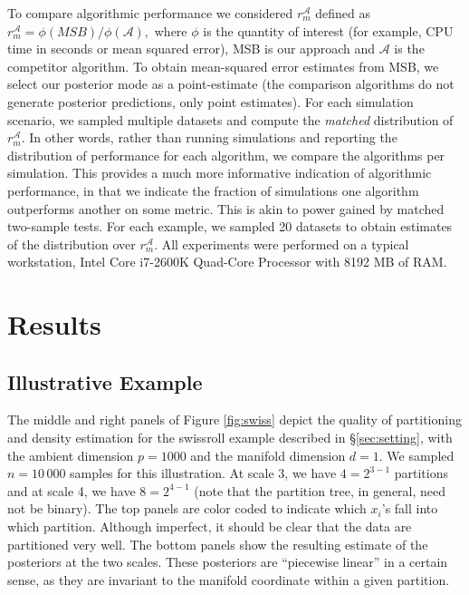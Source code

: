 \documentclass{article} %
\providecommand{\mc}[1]{\mathcal{#1}}
\begin{document}
To compare algorithmic performance we considered $r_{m}^{\mc{A}}$ defined as $r_{m}^{\mc{A}}=\phi(MSB)/\phi(\mc{A}),$
where $\phi$ is the quantity of interest (for example, CPU time in seconds or mean squared error), MSB is our approach and $\mc{A}$ is the competitor algorithm. To obtain mean-squared error estimates from MSB, we select our posterior mode as a point-estimate (the comparison algorithms do not generate posterior predictions, only point estimates).
For each simulation scenario, we sampled multiple datasets and compute the \emph{matched} distribution of $r_{m}^{\mc{A}}$. In other words, rather than running simulations and reporting the distribution of performance for each algorithm, we compare the algorithms per simulation.  This provides a much more informative indication of algorithmic performance, in that we indicate the fraction of simulations one algorithm outperforms another on some metric.  This is akin to power gained by matched two-sample tests.   For each example, we sampled 20 datasets to obtain estimates of the distribution over $r_m^{\mc{A}}$.
% 
All experiments were performed on a typical workstation, Intel Core i7-2600K Quad-Core Processor with  8192 MB of RAM.


\section{Results}

\subsection{Illustrative Example} \label{sub:ill}

The middle and right panels of Figure \ref{fig:swiss} depict the quality of partitioning and density estimation for the swissroll example described in \S \ref{sec:setting}, with the ambient dimension $p=1000$ and the manifold dimension $d=1$.  We sampled $n=10\,000$ samples for this illustration. At scale 3, we have $4=2^{3-1}$ partitions and at scale 4, we have $8=2^{4-1}$ (note that the partition tree, in general, need not be binary).  The top panels are color coded to indicate which  $x_i$'s fall into which partition.  Although imperfect, it should be clear that the data are partitioned very well.  The bottom panels show the resulting estimate of the posteriors at the two scales.  These posteriors are ``piecewise linear'' in a certain sense, as they are invariant to the manifold coordinate within a given partition.  
\end{document}

